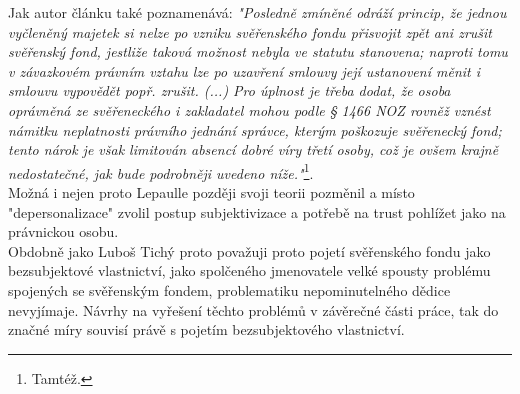 \documentclass{article}
\begin{document}
Jak autor článku také poznamenává: \textit{"Posledně zmíněné odráží princip, že jednou vyčleněný majetek si nelze po vzniku svěřenského fondu přisvojit zpět ani zrušit svěřenský fond, jestliže taková možnost nebyla ve statutu stanovena; naproti tomu v závazkovém právním vztahu lze po uzavření smlouvy její ustanovení měnit i smlouvu vypovědět popř. zrušit. (...) Pro úplnost je třeba dodat, že osoba oprávněná ze svěřeneckého i zakladatel mohou podle § 1466 NOZ rovněž vznést námitku neplatnosti právního jednání správce, kterým poškozuje svěřenecký fond; tento nárok je však limitován absencí dobré víry třetí osoby, což je ovšem krajně nedostatečné, jak bude podrobněji uvedeno níže."}\footnote{Tamtéž.}.\\




Možná i nejen proto Lepaulle později svoji teorii pozměnil a místo "depersonalizace" zvolil postup subjektivizace a potřebě na trust pohlížet jako na právnickou osobu.\\


Obdobně jako Luboš Tichý proto považuji proto pojetí svěřenského fondu jako bezsubjektové vlastnictví, jako spolčeného jmenovatele velké spousty problému spojených se svěřenským fondem, problematiku nepominutelného dědice nevyjímaje. Návrhy na vyřešení těchto problémů v závěrečné části práce, tak do značné míry souvisí právě s pojetím bezsubjektového vlastnictví.\\
\end{document}
